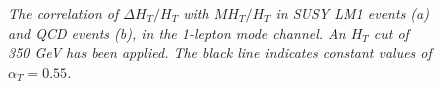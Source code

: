 \begin{figure}[h!]
\begin{minipage}[b]{0.5\linewidth}
\end{minipage}
\caption{\textit{The correlation of $\Delta H_{T}/H_{T}$ with $MH_{T}/H_{T}$ in SUSY LM1 events (a) and QCD events (b), in the 1-lepton mode channel. An $H_{T}$ cut of 350 GeV has been applied. The black line indicates constant values of $\alpha_{T}=0.55$.} }
\vspace{5mm}
\label{fig:cor}
\end{figure}